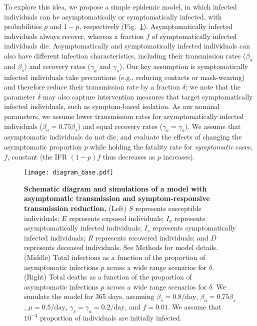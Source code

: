 \documentclass[12pt]{article}
\newcommand{\fref}[1]{Fig.~\ref{fig:#1}}
\begin{document}
To explore this idea, we propose a simple epidemic model,
in which infected individuals can be asymptomatically or symptomatically infected, with probabilities $p$ and $1-p$, respectively (\fref{base}).  
Asymptomatically infected individuals always recover, whereas a fraction $f$ of symptomatically infected individuals die.
Asymptomatically and symptomatically infected individuals can also have different infection characteristics, including their transmission rates ($\beta_a$ and $\beta_s$) and recovery rates ($\gamma_a$ and $\gamma_s$).
Our key assumption is symptomatically infected individuals take precautions (e.g., reducing contacts or mask-wearing) and therefore reduce their transmission rate by a fraction $\delta$;
we note that the parameter $\delta$ may also capture intervention measures that target symptomatically infected individuals, such as symptom-based isolation. 
As our nominal parameters, we assume lower transmission rates for asymptomatically infected individuals ($\beta_a = 0.75 \beta_s$) and equal recovery rates ($\gamma_a = \gamma_s$).
We assume that asymptomatic individuals do not die, and evaluate the effects of changing the asymptomatic proportion $p$ while holding the fatality rate for \emph{symptomatic} cases, $f$, constant (the IFR $(1-p)f$ thus decreases as $p$ increases).

\begin{figure}[!ht]
\texttt{[image: diagram\_base.pdf]}
\caption{
\textbf{Schematic diagram and simulations of a model with asymptomatic transmission and symptom-responsive transmission reduction.}
(Left) $S$ represents susceptible individuals; $E$ represents exposed individuals; $I_a$ represents asymptomatically infected individuals; $I_s$ represents symptomatically infected individuals; $R$ represents recovered individuals; and $D$ represents deceased individuals. See Methods for model details.
(Middle) Total infections as a function of the proportion of asymptomatic infections $p$ across a wide range scenarios for $\delta$.
(Right) Total deaths as a function of the proportion of asymptomatic infections $p$ across a wide range scenarios for $\delta$.
We simulate the model for 365 days, assuming $\beta_s = 0.8/\mathrm{day}$, $\beta_a = 0.75 \beta_s$, $\mu=0.5/\mathrm{day}$, $\gamma_s=\gamma_a=0.2/\mathrm{day}$, and $f=0.01$.
We assume that $10^{-4}$ proportion of individuals are initially infected.
}
\label{fig:base}
\end{figure}
\end{document}
